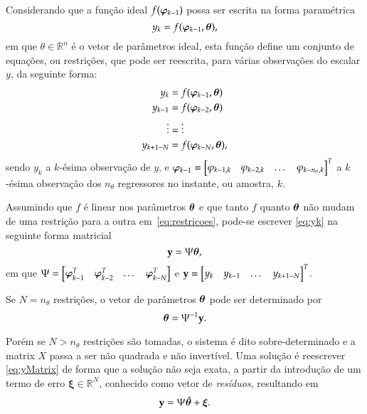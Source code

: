 Considerando que a função ideal $f(\bm{\varphi}_{k-1})$ possa ser escrita na forma paramétrica 
\begin{equation}
    y_k = f(\bm{\varphi}_{k-1},\bm{\theta}),
   \label{eq:yk}
\end{equation}
em que $\theta \in \mathbb{R}^n$  é o vetor de parâmetros ideal, esta função define um conjunto de equações, ou restrições, que pode ser reescrita, para várias observações do escalar $y$, da seguinte forma:
\begin{align}
\label{eq:restricoes}
   y_k &= f(\bm{\varphi}_{k-1}, \bm{\theta}) \nonumber\\
   y_{k-1} &= f(\bm{\varphi}_{k-2}, \bm{\theta}) \\ 
   \vdots &= \vdots \nonumber\\
   y_{k+1-N} &= f(\bm{\varphi}_{k-N}, \bm{\theta}),\nonumber
\end{align}
sendo $y_k$ a $k$-ésima observação de $y$, e $\bm{\varphi}_{k-1}= \begin{bmatrix} \varphi_{k-1,k} & \varphi_{k-2,k} & \dots & \varphi_{k-n_\theta,k} \end{bmatrix}^T$ a $k$-ésima observação dos $n_\theta$ regressores no instante, ou amostra, $k$.  

Assumindo que $f$ é linear nos parâmetros $\bm{\theta}$ e que tanto $f$ quanto $\bm{\theta}$ não mudam de uma restrição para a outra em~\eqref{eq:restricoes}, pode-se escrever \eqref{eq:yk} na seguinte forma matricial
\begin{equation}
\label{eq:yMatrix}
   \mathrm{\mathbf{y}} = \Psi\bm{\theta},
\end{equation}
em que $\Psi = \begin{bmatrix} \bm{\varphi}_{k-1}^T & \bm{\varphi}_{k-2}^T & \dots & \bm{\varphi}_ {k-N}^T \end{bmatrix}$ e $\mathrm{\mathbf{y}} = \begin{bmatrix} y_k & y_{k-1} & \dots & y_{k+1-N} \end{bmatrix}^T$.

Se $N=n_\theta$ restrições, o vetor de parâmetros $\bm{\theta}$ pode ser determinado por
\begin{equation}
   \bm{\theta} = \Psi^{-1}\mathrm{\mathbf{y}}
\label{eq:thetaest}.
\end{equation}

Porém se $N > n_\theta$ restrições são tomadas, o sistema é dito sobre-determinado e a matrix $X$ passa a ser não quadrada e não invertível. Uma solução é reescrever \eqref{eq:yMatrix} de forma que a solução não seja exata, a partir da introdução de um termo de erro $\bm{\xi} \in \mathbb{R}^N$, conhecido como vetor de \emph{resíduos}, resultando em
\begin{equation} 
\label{eq:ysobredet}
   \mathrm{\mathbf{y}} =  \Psi\hat{\bm{\theta}} + \bm{\xi}.
\end{equation}

